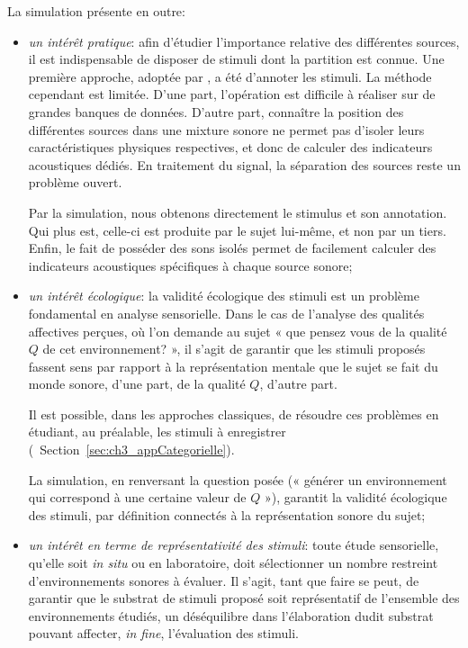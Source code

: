 La simulation présente en outre:

\begin{itemize}
\item \emph{un intérêt pratique}: afin d'étudier l'importance relative des différentes sources, il est indispensable de disposer de stimuli dont la partition est connue. Une première approche, adoptée par \citep{lavandier2006contribution}, a été d'annoter les stimuli. La méthode cependant est limitée. 
D'une part, l'opération est difficile à réaliser sur de grandes banques de données. D'autre part, connaître la position des différentes sources dans une mixture sonore ne permet pas d'isoler leurs caractéristiques physiques respectives, et donc de calculer des indicateurs acoustiques dédiés. En traitement du signal, la séparation des sources reste un problème ouvert\citep{vincent2014blind}.

Par la simulation, nous obtenons directement le stimulus et son annotation. Qui plus est, celle-ci est produite par le sujet lui-même, et non par un tiers. Enfin, le fait de posséder des sons isolés permet de facilement calculer des indicateurs acoustiques spécifiques à chaque source sonore;

\item \emph{un intérêt écologique}: la validité écologique des stimuli est un problème fondamental en analyse sensorielle. Dans le cas de l'analyse des qualités affectives perçues, où l'on demande au sujet « que pensez vous de la qualité $Q$ de cet environnement? », il s'agit de garantir que les stimuli proposés fassent sens par rapport à la représentation mentale que le sujet se fait du monde sonore, d'une part, de la qualité $Q$, d'autre part.

Il est possible, dans les approches classiques, de résoudre ces problèmes en étudiant, au préalable, les stimuli à enregistrer (\cf~Section~\ref{sec:ch3_appCategorielle}). 

La simulation, en renversant la question posée (« générer un environnement qui correspond à une certaine valeur de $Q$ »), garantit la validité écologique des stimuli, par définition connectés à la représentation sonore du sujet;

\item \emph{un intérêt en terme de représentativité des stimuli}: toute étude sensorielle, qu'elle soit \emph{in situ} ou en laboratoire, doit sélectionner un nombre restreint d'environnements sonores à évaluer. Il s'agit, tant que faire se peut, de garantir que le substrat de stimuli proposé soit représentatif de l'ensemble des environnements étudiés, un déséquilibre dans l'élaboration dudit substrat pouvant affecter, \emph{in fine}, l'évaluation des stimuli. 


\end{itemize}
